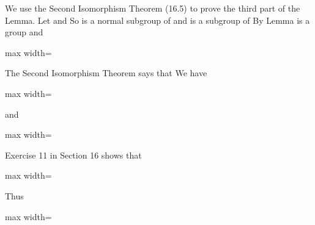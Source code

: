 \documentclass[11pt,oneside]{article}
\begin{document}
\begin{BookBody}
We use the Second Isomorphism Theorem (16.5) to prove the third part of the Lemma. Let  and  So  is a normal subgroup of  and  is a subgroup of  By Lemma  is a group and

\begin{center}\begin{adjustbox}{max width=\linewidth}\end{adjustbox}\end{center}

\noindent The Second Isomorphism Theorem says that  We have

\begin{center}\begin{adjustbox}{max width=\linewidth}\end{adjustbox}\end{center}

\noindent and

\begin{center}\begin{adjustbox}{max width=\linewidth}\end{adjustbox}\end{center}

\noindent Exercise 11 in Section 16 shows that

\begin{center}\begin{adjustbox}{max width=\linewidth}\end{adjustbox}\end{center}

\noindent Thus

\begin{center}\begin{adjustbox}{max width=\linewidth}\end{adjustbox}\end{center}

\end{BookBody}
\end{document}
